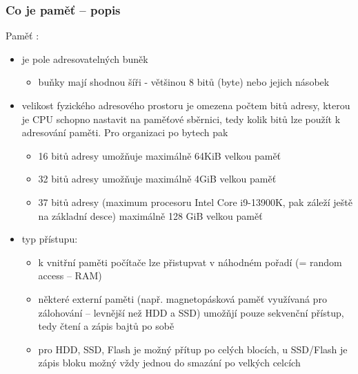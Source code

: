 \documentclass{beamer}
\begin{document}
\begin{frame}
\frametitle{Co je paměť -- popis}

Paměť :
\begin{itemize}
\item je pole adresovatelných buněk
\begin{itemize}
\item buňky mají shodnou šíři - většinou 8 bitů (byte) nebo jejich násobek
\end{itemize}
\item velikost fyzického adresového prostoru je omezena počtem bitů adresy, kterou je CPU schopno nastavit na paměťové sběrnici, tedy kolik bitů lze použít k adresování paměti. Pro organizaci po bytech pak
\begin{itemize}
\item 16 bitů adresy umožňuje maximálně 64KiB velkou paměť
\item 32 bitů adresy umožňuje maximálně 4GiB velkou paměť
\item 37 bitů adresy (maximum procesoru Intel Core  i9-13900K, pak záleží ještě na základní desce) maximálně 128 GiB velkou paměť
\end{itemize}
\item typ přístupu:
\begin{itemize}
\item k vnitřní paměti počítače lze přistupvat v náhodném pořadí (= random access -- RAM)
\item některé externí paměti (např. magnetopásková paměť využívaná pro zálohování -- levnější než HDD a SSD) umožňjí pouze sekvenční přístup, tedy čtení a zápis bajtů po sobě
\item pro HDD, SSD, Flash je možný přítup po celých blocích, u SSD/Flash je zápis bloku možný vždy jednou do smazání po velkých celcích
\end{itemize}
\end{itemize}

\end{frame}
\end{document}
